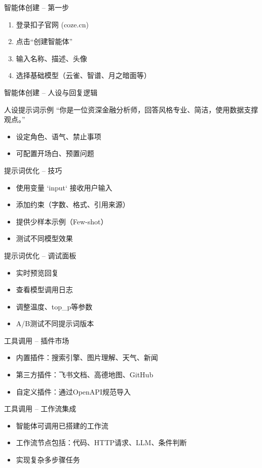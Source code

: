 \begin{frame}{智能体创建 – 第一步}
\begin{enumerate}
    \item 登录扣子官网 (coze.cn)
    \item 点击“创建智能体”
    \item 输入名称、描述、头像
    \item 选择基础模型（云雀、智谱、月之暗面等）
\end{enumerate}
\end{frame}
\begin{frame}{智能体创建 – 人设与回复逻辑}
\begin{block}{人设提示词示例}
“你是一位资深金融分析师，回答风格专业、简洁，使用数据支撑观点。”
\end{block}
\begin{itemize}
    \item 设定角色、语气、禁止事项
    \item 可配置开场白、预置问题
\end{itemize}
\end{frame}

\begin{frame}{提示词优化 – 技巧}
\begin{itemize}
    \item 使用变量 `{{input}}` 接收用户输入
    \item 添加约束（字数、格式、引用来源）
    \item 提供少样本示例（Few-shot）
    \item 测试不同模型效果
\end{itemize}
\end{frame}
\begin{frame}{提示词优化 – 调试面板}
\begin{itemize}
    \item 实时预览回复
    \item 查看模型调用日志
    \item 调整温度、top\_p等参数
    \item A/B测试不同提示词版本
\end{itemize}
\end{frame}

\begin{frame}{工具调用 – 插件市场}
\begin{itemize}
    \item 内置插件：搜索引擎、图片理解、天气、新闻
    \item 第三方插件：飞书文档、高德地图、GitHub
    \item 自定义插件：通过OpenAPI规范导入
\end{itemize}
\end{frame}
\begin{frame}{工具调用 – 工作流集成}
\begin{itemize}
    \item 智能体可调用已搭建的工作流
    \item 工作流节点包括：代码、HTTP请求、LLM、条件判断
    \item 实现复杂多步骤任务
\end{itemize}
\end{frame}

